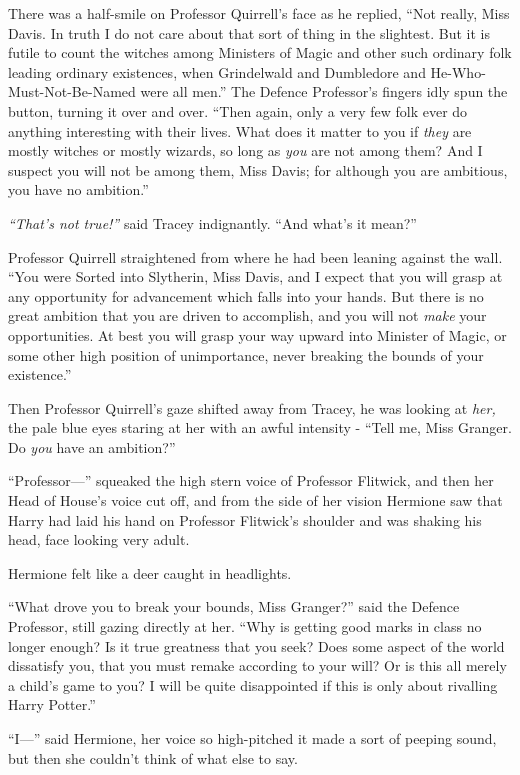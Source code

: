 There was a half-smile on Professor Quirrell's face as he replied, ``Not
really, Miss Davis. In truth I do not care about that sort of thing in
the slightest. But it is futile to count the witches among Ministers of
Magic and other such ordinary folk leading ordinary existences, when
Grindelwald and Dumbledore and He-Who-Must-Not-Be-Named were all men.''
The Defence Professor's fingers idly spun the button, turning it over
and over. ``Then again, only a very few folk ever do anything
interesting with their lives. What does it matter to you if \emph{they}
are mostly witches or mostly wizards, so long as \emph{you} are not
among them? And I suspect you will not be among them, Miss Davis; for
although you are ambitious, you have no ambition.''

\emph{``That's not true!''} said Tracey indignantly. ``And what's it
mean?''

Professor Quirrell straightened from where he had been leaning against
the wall. ``You were Sorted into Slytherin, Miss Davis, and I expect
that you will grasp at any opportunity for advancement which falls into
your hands. But there is no great ambition that you are driven to
accomplish, and you will not \emph{make} your opportunities. At best you
will grasp your way upward into Minister of Magic, or some other high
position of unimportance, never breaking the bounds of your existence.''

Then Professor Quirrell's gaze shifted away from Tracey, he was looking
at \emph{her,} the pale blue eyes staring at her with an awful intensity
- ``Tell me, Miss Granger. Do \emph{you} have an ambition?''

``Professor---'' squeaked the high stern voice of Professor Flitwick,
and then her Head of House's voice cut off, and from the side of her
vision Hermione saw that Harry had laid his hand on Professor Flitwick's
shoulder and was shaking his head, face looking very adult.

Hermione felt like a deer caught in headlights.

``What drove you to break your bounds, Miss Granger?'' said the Defence
Professor, still gazing directly at her. ``Why is getting good marks in
class no longer enough? Is it true greatness that you seek? Does some
aspect of the world dissatisfy you, that you must remake according to
your will? Or is this all merely a child's game to you? I will be quite
disappointed if this is only about rivalling Harry Potter.''

``I---'' said Hermione, her voice so high-pitched it made a sort of
peeping sound, but then she couldn't think of what else to say.

